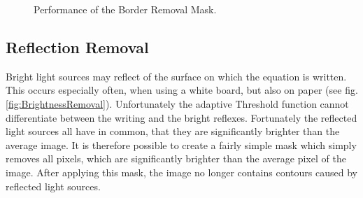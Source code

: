 \documentclass[12pt]{article}
\begin{document}
	\begin{figure}[htp]
		\centering
		\quad
		
		\quad
		
		\caption{Performance of the Border Removal Mask.}
		\label{fig:BorderRemoval}
	\end{figure}

	\subsection{Reflection Removal}
		Bright light sources may reflect of the surface on which the equation is written.
		This occurs especially often, when using a white board, but also on paper (see fig. \ref{fig:BrightnessRemoval}).
		Unfortunately the adaptive Threshold function cannot differentiate between the writing and the bright reflexes.
		Fortunately the reflected light sources all have in common, that they are significantly brighter than the average image.
		It is therefore possible to create a fairly simple mask which simply removes all pixels, which are significantly brighter than the average pixel of the image.
		After applying this mask, the image no longer contains contours caused by reflected light sources.%
		
\end{document}
